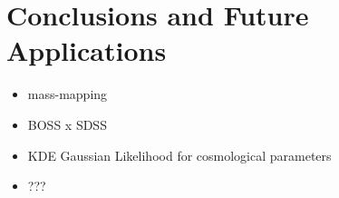 

\section{Conclusions and Future Applications}

\begin{itemize}
\item mass-mapping 
\item  BOSS x SDSS
\item KDE Gaussian Likelihood for cosmological parameters
\item  ???
\end{itemize}
